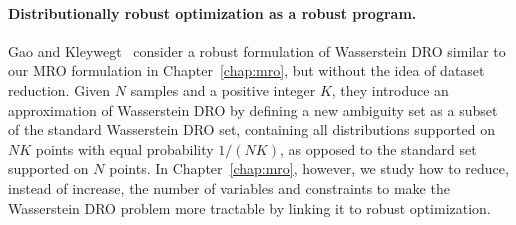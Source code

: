 

\paragraph{Distributionally robust optimization as a robust program.}
Gao and Kleywegt~\cite{gao2016distributionally} consider a robust formulation of Wasserstein \gls{DRO} similar to our \gls{MRO} formulation in Chapter~\ref{chap:mro}, but without the idea of dataset reduction.
Given $N$ samples and a positive integer $K$, they introduce an approximation of Wasserstein \gls{DRO} by defining a new ambiguity set as a subset of the standard Wasserstein \gls{DRO} set, containing all distributions supported on $NK$ points with equal probability $1/(NK)$, as opposed to the standard set supported on $N$ points.
In Chapter~\ref{chap:mro}, however, we study how to reduce, instead of increase, the number of variables and constraints to make the Wasserstein \gls{DRO} problem more tractable by linking it to robust optimization.

